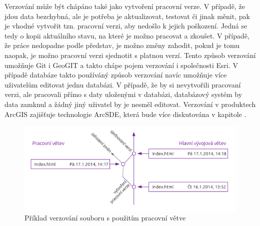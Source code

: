 Verzování může být chápáno také jako vytvoření pracovní verze. V případě, že jdou data bezchybná, ale je potřeba je aktualizovat, testovat či jinak měnit, pak je vhodné vytvořit tzn. pracovní verzi, aby nedošlo k jejich poškození. Jedná se tedy o kopii aktuálního stavu, na které je možno pracovat a zkoušet. V případě, že práce nedopadne podle představ, je možno změny zahodit, pokud je tomu naopak, je možno pracovní verzi sjednotit s platnou verzí. Tento způsob verzování umožňuje Git i GeoGIT a takto chápe pojem verzování i společnosti Esri. V případě databáze takto používáný způsob verzování navíc umožňuje více uživatelům editovat jednu databázi. V případě, že by si nevytvořili pracovaní verzi, ale pracovali přímo s daty uloženými v databázi, databázový systém by data zamknul a žádný jiný uživatel by je nesměl editovat. Verzování v produktech ArcGIS zajišťuje technologie ArcSDE, která bude více diskutována v kapitole .

          \begin{figure}[H]
            \centering
            \includegraphics[scale=1]{../../../grafy/obr/schema_verzovaniBranch.png}
            \caption {Příklad verzování souboru s použitím pracovní větve}
          \end{figure}

        

